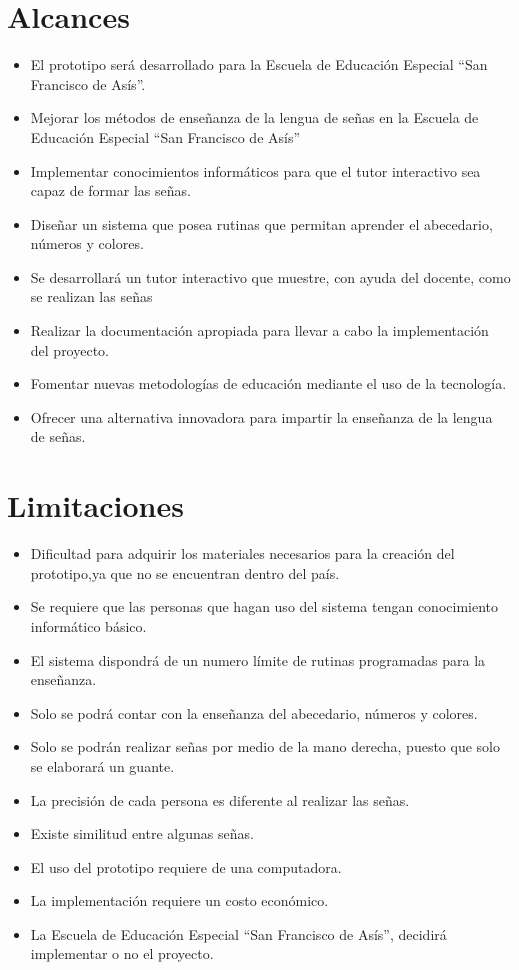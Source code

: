 \documentclass[12pt]{report}%
\begin{document}
\section{Alcances}
\begin{itemize}
\item El prototipo será desarrollado para la Escuela de Educación Especial “San Francisco de Asís”.
\item Mejorar los métodos de enseñanza de la lengua de señas en la Escuela de Educación Especial “San Francisco de Asís”
\item Implementar conocimientos informáticos para que el tutor interactivo sea capaz de formar las señas.
\item Diseñar un sistema que posea rutinas que permitan aprender el abecedario, números y colores.
\item Se desarrollará un tutor interactivo que muestre, con ayuda del docente, como se realizan las señas
\item Realizar la documentación apropiada para llevar a cabo la implementación del proyecto. 
\item Fomentar nuevas metodologías de educación mediante el uso de la tecnología. 
\item Ofrecer una alternativa innovadora para impartir la enseñanza de la lengua de señas.
\end{itemize}



\section{Limitaciones}
\begin{itemize}
\item Dificultad para adquirir los materiales necesarios para la creación del prototipo,ya que no se encuentran dentro del país.
\item Se requiere que las personas que hagan uso del sistema tengan conocimiento informático básico.
\item El sistema dispondrá de un numero límite de rutinas programadas para la enseñanza.
\item Solo se podrá contar con la enseñanza del abecedario, números y colores. 
\item Solo se podrán realizar señas por medio de la mano derecha, puesto que solo se elaborará un guante. 
\item La precisión de cada persona es diferente al realizar las señas.
\item Existe similitud entre algunas señas.
\item El uso del prototipo requiere de una computadora. 
\item La implementación requiere un costo económico.
\item La Escuela de Educación Especial “San Francisco de Asís”, decidirá implementar o no el proyecto. 
 
\end{itemize}
\end{document}
